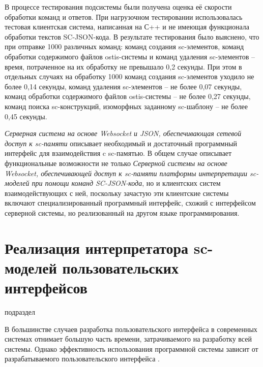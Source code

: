\begin{textitemize}
    \item В процессе тестирования подсистемы были получена оценка её скорости обработки команд и ответов. При нагрузочном тестировании использовалась тестовая клиентская система, написанная на С++ и не имеющая функционала обработки текстов SC-JSON-кода. В результате тестирования было выяснено, что при отправке 1000 различных команд: команд создания sc-элементов, команд обработки содержимого файлов ostis-системы и команд удаления sc-элементов -- время, потраченное на их обработку не превышало 0,2 секунды. При этом в отдельных случаях на обработку 1000 команд создания sc-элементов уходило не более 0,14 секунды, команд удаления sc-элементов -- не более 0,07 секунды, команд обработки содержимого файлов ostis-системы -- не более 0,27 секунды, команд поиска sc-конструкций, изоморфных заданному sc-шаблону -- не более 0,45 секунды.
\end{textitemize}

\textit{Серверная система на основе Websocket и JSON, обеспечивающая сетевой доступ к sc-памяти} описывает необходимый и достаточный программный интерфейс для взаимодействия c sc-памятью. В общем случае описывает функциональные возможности не только \textit{Серверной системы на основе Websocket, обеспечивающей доступ к sc-памяти платформы интерпретации sc-моделей при помощи команд SC-JSON-кода}, но и клиентских систем взаимодействующих с ней, поскольку зачастую эти клиентские системы включают специализированный программный интерфейс, схожий с интерфейсом серверной системы, но реализованный на другом языке программирования.

\section{Реализация интерпретатора sc-моделей пользовательских интерфейсов}
\label{sec_soft_platform_sci_machine}

\begin{SCn}

\begin{scnrelfromlist}{подраздел}
\end{scnrelfromlist}

\end{SCn}

В большинстве случаев разработка пользовательского интерфейса в современных системах отнимает большую часть времени, затрачиваемого на разработку всей системы. Однако эффективность использования программной системы зависит от разрабатываемого пользовательского интерфейса \cite{Myers1992}.

